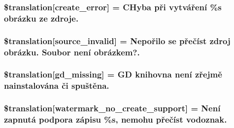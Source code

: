 \subsubsection[{\$translation}]{\setlength{\rightskip}{0pt plus 5cm}\$translation\mbox{[}\textquotesingle{}create\+\_\+error\textquotesingle{}\mbox{]} = \textquotesingle{}C\+Hyba při vytváření \%s obrázku ze zdroje.\textquotesingle{}}\label{class_8upload_8cs___c_s_8php_a53013ce9255c4e1849098ddd9fdb2b3f}
\hypertarget{class_8upload_8cs___c_s_8php_a6ab0a660b457eaf2d3434b225449fdd6}{}
\subsubsection[{\$translation}]{\setlength{\rightskip}{0pt plus 5cm}\$translation\mbox{[}\textquotesingle{}source\+\_\+invalid\textquotesingle{}\mbox{]} = \textquotesingle{}Nepořilo se přečíst zdroj obrázku. Soubor není obrázkem?.\textquotesingle{}}\label{class_8upload_8cs___c_s_8php_a6ab0a660b457eaf2d3434b225449fdd6}
\hypertarget{class_8upload_8cs___c_s_8php_a7f3dfcc0db4bbc0f2e7210c439798e56}{}
\subsubsection[{\$translation}]{\setlength{\rightskip}{0pt plus 5cm}\$translation\mbox{[}\textquotesingle{}gd\+\_\+missing\textquotesingle{}\mbox{]} = \textquotesingle{}G\+D knihovna není zřejmě nainstalována či spuštěna.\textquotesingle{}}\label{class_8upload_8cs___c_s_8php_a7f3dfcc0db4bbc0f2e7210c439798e56}
\hypertarget{class_8upload_8cs___c_s_8php_a82d5853430ab72dc1f9799ec36144cc6}{}
\subsubsection[{\$translation}]{\setlength{\rightskip}{0pt plus 5cm}\$translation\mbox{[}\textquotesingle{}watermark\+\_\+no\+\_\+create\+\_\+support\textquotesingle{}\mbox{]} = \textquotesingle{}Není zapnutá podpora zápisu \%s, nemohu přečíst vodoznak.\textquotesingle{}}\label{class_8upload_8cs___c_s_8php_a82d5853430ab72dc1f9799ec36144cc6}
\hypertarget{class_8upload_8cs___c_s_8php_aabca0b65dadbc6184415c16375f284ca}{}
